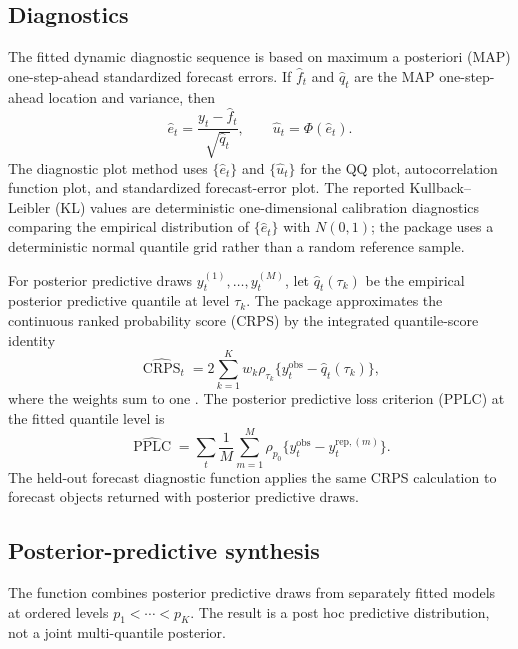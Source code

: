 \documentclass{jss}
\newcommand{\CRPS}{\operatorname{CRPS}}
\newcommand{\PPLC}{\operatorname{PPLC}}
\begin{document}
\subsection{Diagnostics}

The fitted dynamic diagnostic sequence is based on maximum a posteriori (MAP)
one-step-ahead standardized forecast errors. If $\widehat f_t$ and
$\widehat q_t$ are the MAP one-step-ahead location and variance, then
\begin{equation}
\widehat e_t = \frac{y_t-\widehat f_t}{\sqrt{\widehat q_t}},
\qquad
\widehat u_t = \Phi(\widehat e_t).
\label{eq:pit_plugin}
\end{equation}
The diagnostic plot method uses $\{\widehat e_t\}$ and $\{\widehat u_t\}$ for
the QQ plot, autocorrelation function plot, and standardized forecast-error
plot. The reported Kullback--Leibler (KL) values are deterministic
one-dimensional calibration diagnostics comparing the empirical distribution
of $\{\widehat e_t\}$ with $N(0,1)$; the package uses a deterministic normal
quantile grid rather than a random reference sample.

For posterior predictive draws $y_t^{(1)},\ldots,y_t^{(M)}$, let
$\widehat q_t(\tau_k)$ be the empirical posterior predictive quantile at
level $\tau_k$. The package approximates the continuous ranked probability
score (CRPS) by the integrated quantile-score identity
\begin{equation}
\widehat{\CRPS}_t
=
2\sum_{k=1}^{K}
w_k
\rho_{\tau_k}\{y_t^{\mathrm{obs}}-\widehat q_t(\tau_k)\},
\label{eq:crps_estimator}
\end{equation}
where the weights sum to one \citep{gneiting2007,laio2007verification}. The
posterior predictive loss criterion (PPLC) at the fitted quantile level is
\begin{equation}
\widehat{\PPLC}
=
\sum_t
\frac{1}{M}\sum_{m=1}^M
\rho_{p_0}\{y_t^{\mathrm{obs}}-y_t^{\mathrm{rep},(m)}\}.
\label{eq:pplc_estimator}
\end{equation}
The held-out forecast diagnostic function applies the same CRPS calculation
to forecast objects returned with posterior predictive draws.

\subsection{Posterior-predictive synthesis}

The function  combines posterior predictive draws
from separately fitted models at ordered levels $p_1<\cdots<p_K$. The result
is a post hoc predictive distribution, not a joint multi-quantile posterior.
\end{document}
